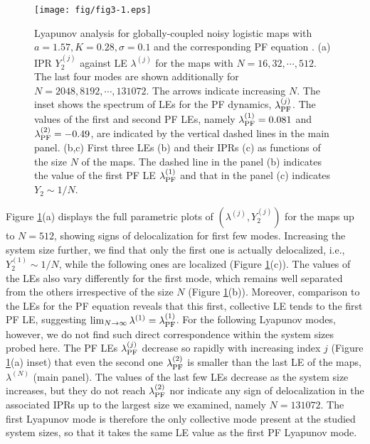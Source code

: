 \documentclass[12pt]{iopart}
\begin{document}
\begin{figure}[t]
 \begin{center}
  \texttt{[image: fig/fig3-1.eps]}
  \caption{Lyapunov analysis for globally-coupled noisy logistic maps  with $a=1.57, K=0.28, \sigma = 0.1$ and the corresponding PF equation . (a) IPR $Y_2^{(j)}$ against LE $\lambda^{(j)}$ for the maps with $N = 16, 32, \cdots, 512$. The last four modes are shown additionally for $N = 2048, 8192, \cdots, 131072$. The arrows indicate increasing $N$. The inset shows the spectrum of LEs for the PF dynamics, $\lambda_{\rm PF}^{(j)}$. The values of the first and second PF LEs, namely $\lambda_{\rm PF}^{(1)} = 0.081$ and $\lambda_{\rm PF}^{(2)} = -0.49$, are indicated by the vertical dashed lines in the main panel. (b,c) First three LEs (b) and their IPRs (c) as functions of the size $N$ of the maps. The dashed line in the panel (b) indicates the value of the first PF LE $\lambda_{\rm PF}^{(1)}$ and that in the panel (c) indicates $Y_2 \sim 1/N$.}
  \label{fig:3-1}
 \end{center}
\end{figure}%

Figure \ref{fig:3-1}(a) displays
 the full parametric plots of $(\lambda^{(j)}, Y_2^{(j)})$
 for the maps up to $N=512$,
 showing signs of delocalization for first few modes.
Increasing the system size further,
 we find that only the first one is actually delocalized, i.e.,
 $Y_2^{(1)} \sim 1/N$,
 while the following ones are localized (Figure \ref{fig:3-1}(c)).
The values of the LEs also vary differently for the first mode,
 which remains well separated from the others
 irrespective of the size $N$ (Figure \ref{fig:3-1}(b)).
Moreover, comparison to the LEs for the PF equation
 reveals that this first, collective LE tends to the first PF LE,
 suggesting $\lim_{N\to\infty} \lambda^{(1)} = \lambda_{\rm PF}^{(1)}$.
For the following Lyapunov modes, however,
 we do not find such direct correspondence
 within the system sizes probed here.
The PF LEs $\lambda_{\rm PF}^{(j)}$ decrease so rapidly
 with increasing index $j$ (Figure \ref{fig:3-1}(a) inset)
 that even the second one $\lambda_{\rm PF}^{(2)}$
 is smaller than the last LE of the maps, $\lambda^{(N)}$
 (main panel).
The values of the last few LEs decrease as the system size increases,
 but they do not reach $\lambda_{\rm PF}^{(2)}$
 nor indicate any sign of delocalization in the associated IPRs
 up to the largest size we examined, namely $N=131072$.
The first Lyapunov mode is therefore the only collective mode
 present at the studied system sizes,
 so that it takes the same LE value as the first PF Lyapunov mode.
\end{document}
